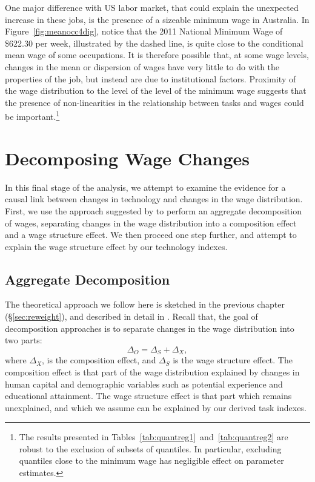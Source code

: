 One major difference with US labor market, that could explain the unexpected increase in these jobs, is the presence of a sizeable minimum wage in Australia. In Figure~\ref{fig:meanocc4dig}, notice that the 2011 National Minimum Wage of \$622.30 per week, illustrated by the dashed line, is quite close to the conditional mean wage of some occupations. It is therefore possible that, at some wage levels, changes in the mean or dispersion of wages have very little to do with the properties of the job, but instead are due to institutional factors. Proximity of the wage distribution to the level of the level of the minimum wage suggests that the presence of non-linearities in the relationship between tasks and wages could be important.\footnote{The results presented in Tables~\ref{tab:quantreg1}~and~\ref{tab:quantreg2} are robust to the exclusion of subsets of quantiles. In particular, excluding quantiles close to the minimum wage has negligible effect on parameter estimates.}

\section{Decomposing Wage Changes}

In this final stage of the analysis, we attempt to examine the evidence for a causal link between changes in technology and changes in the wage distribution. First, we use the approach suggested by \citet{DiNardo1996} to perform an aggregate decomposition of wages, separating changes in the wage distribution into a composition effect and a wage structure effect. We then proceed one step further, and attempt to explain the wage structure effect by our technology indexes.

\subsection{Aggregate Decomposition} \label{sec:id}

The theoretical approach we follow here is sketched in the previous chapter (\S\ref{sec:reweight}), and described in detail in \citet{DiNardo1996}. Recall that, the goal of decomposition approaches is to separate changes in the wage distribution into two parts:
$$
\Delta_O = \Delta_S + \Delta_X,
$$
where $\Delta_X$, is the composition effect, and $\Delta_S$ is the wage structure effect. The composition effect is that part of the wage distribution explained by changes in human capital and demographic variables such as potential experience and educational attainment. The wage structure effect is that part which remains unexplained, and which we assume can be explained by our derived task indexes.

